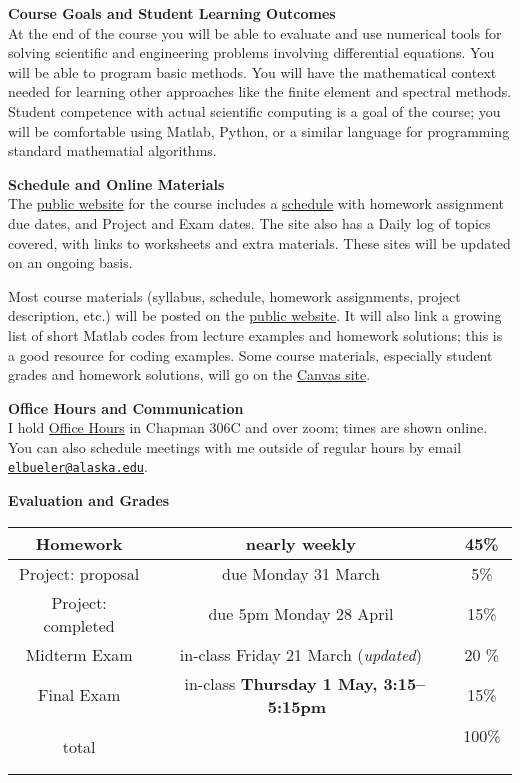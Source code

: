 \documentclass[12pt]{article}
\renewcommand{\emph}[1]{\textsf{\textbf{#1}}}
\newcommand{\localhead}[1]{\par\smallskip\textbf{#1} \smallskip\nobreak\\}%
\def\heading#1{\localhead{\large\emph{#1}}}
\begin{document}
\clearpage\newpage
\phantom{x}\vspace{-3mm}

\heading{Course Goals and Student Learning Outcomes}
At the end of the course you will be able to evaluate and use numerical tools for solving scientific and engineering problems involving differential equations.  You will be able to program basic methods.  You will have the mathematical context needed for learning other approaches like the finite element and spectral methods.  Student competence with actual scientific computing is a goal of the course; you will be comfortable using Matlab, Python, or a similar language for programming standard mathematial algorithms.


\heading{Schedule and Online Materials}
The \href{https://bueler.github.io/nade/}{public website} for the course includes a \href{https://bueler.github.io/nade/assets/general/S25/schedule.pdf}{schedule} with homework assignment due dates, and Project and Exam dates.  The site also has a Daily log of topics covered, with links to worksheets and extra materials.  These sites will be updated on an ongoing basis.

Most course materials (syllabus, schedule, homework assignments, project description, etc.) will be posted on the \href{https://bueler.github.io/nade/}{public website}.  It will also link a growing list of short Matlab codes from lecture examples and homework solutions; this is a good resource for coding examples.  Some course materials, especially student grades and homework solutions, will go on the \href{https://canvas.alaska.edu/courses/24194}{Canvas site}.


\heading{Office Hours and Communication}
I hold \href{http://bueler.github.io/OffHrs.htm}{Office Hours} in Chapman 306C and over zoom; times are shown online.  You can also schedule meetings with me outside of regular hours by email \href{mailto:elbueler@alaska.edu}{\texttt{elbueler@alaska.edu}}.

\medskip
\heading{Evaluation and Grades}
\vskip -10pt

\begin{tabular}{|c|c|c|}
\hline
Homework & nearly weekly & 45\% \\
\hline
Project: proposal & due Monday 31 March & 5\%  \\
\hline
Project: completed & due 5pm Monday 28 April & 15\%  \\
\hline
{\color{red} Midterm Exam} & {\color{red} in-class Friday 21 March (\textsl{updated})} & 20 \%  \\
\hline
Final Exam & \, in-class \emph{Thursday 1 May, 3:15--5:15pm} \, & 15\% \\
\hline
total & & 100\% \, \\
\hline
\end{tabular}
\end{document}
